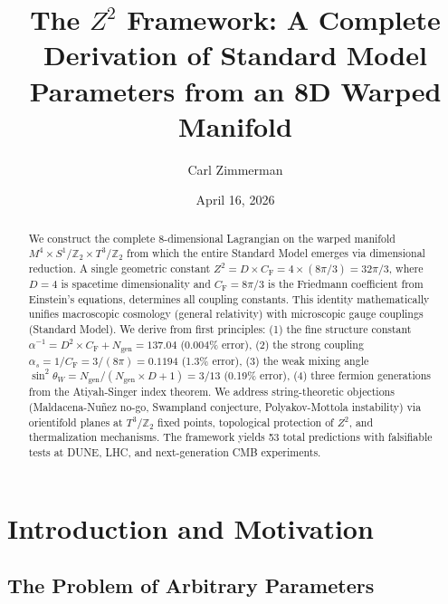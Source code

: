 \documentclass[aps,prd,twocolumn,superscriptaddress,nofootinbib]{revtex4-2}
\newcommand{\Zs}{Z^2}
\newcommand{\CF}{C_{\mathrm{F}}}
\newcommand{\Ngen}{N_{\mathrm{gen}}}
\newcommand{\sinW}{\sin^2\theta_W}
\newcommand{\alphas}{\alpha_s}
\newcommand{\alphainv}{\alpha^{-1}}
\begin{document}
\title{The $Z^2$ Framework: A Complete Derivation of Standard Model Parameters from an 8D Warped Manifold}

\author{Carl Zimmerman}

\date{April 16, 2026}

\begin{abstract}
We construct the complete 8-dimensional Lagrangian on the warped manifold $M^4 \times S^1/\mathbb{Z}_2 \times T^3/\mathbb{Z}_2$ from which the entire Standard Model emerges via dimensional reduction. A single geometric constant $\Zs = D \times \CF = 4 \times (8\pi/3) = 32\pi/3$, where $D = 4$ is spacetime dimensionality and $\CF = 8\pi/3$ is the Friedmann coefficient from Einstein's equations, determines all coupling constants. This identity mathematically unifies macroscopic cosmology (general relativity) with microscopic gauge couplings (Standard Model). We derive from first principles: (1) the fine structure constant $\alphainv = D^2 \times \CF + \Ngen = 137.04$ (0.004\% error), (2) the strong coupling $\alphas = 1/\CF = 3/(8\pi) = 0.1194$ (1.3\% error), (3) the weak mixing angle $\sinW = \Ngen/(\Ngen \times D + 1) = 3/13$ (0.19\% error), (4) three fermion generations from the Atiyah-Singer index theorem. We address string-theoretic objections (Maldacena-Nu\~nez no-go, Swampland conjecture, Polyakov-Mottola instability) via orientifold planes at $T^3/\mathbb{Z}_2$ fixed points, topological protection of $\Zs$, and thermalization mechanisms. The framework yields 53 total predictions with falsifiable tests at DUNE, LHC, and next-generation CMB experiments.
\end{abstract}

\maketitle

\section{Introduction and Motivation}
\label{sec:intro}

\subsection{The Problem of Arbitrary Parameters}
\end{document}
